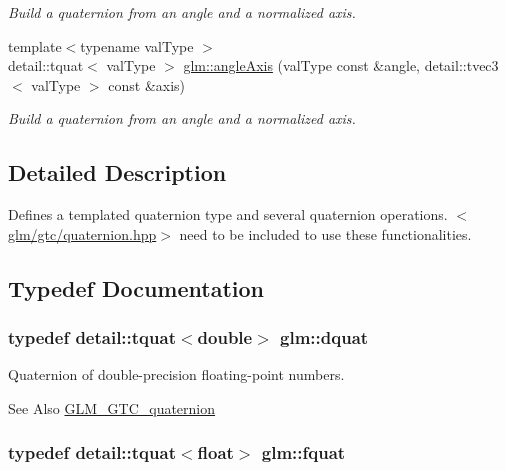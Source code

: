\begin{DoxyCompactItemize}
\begin{DoxyCompactList}\small\item\em Build a quaternion from an angle and a normalized axis. \end{DoxyCompactList}\item 
{\footnotesize template$<$typename val\-Type $>$ }\\detail\-::tquat$<$ val\-Type $>$ \hyperlink{group__gtc__quaternion_ga30071b5b9773087b7212a5ce67d0d90a}{glm\-::angle\-Axis} (val\-Type const \&angle, detail\-::tvec3$<$ val\-Type $>$ const \&axis)
\begin{DoxyCompactList}\small\item\em Build a quaternion from an angle and a normalized axis. \end{DoxyCompactList}\end{DoxyCompactItemize}


\subsection{Detailed Description}
Defines a templated quaternion type and several quaternion operations. $<$\hyperlink{quaternion_8hpp}{glm/gtc/quaternion.\-hpp}$>$ need to be included to use these functionalities. 

\subsection{Typedef Documentation}
\hypertarget{group__gtc__quaternion_ga80d5f590dba4e894218e1263233b02bb}{
\subsubsection[{dquat}]{\setlength{\rightskip}{0pt plus 5cm}typedef detail\-::tquat$<$double$>$ {\bf glm\-::dquat}}}\label{group__gtc__quaternion_ga80d5f590dba4e894218e1263233b02bb}


Quaternion of double-\/precision floating-\/point numbers. 

\begin{DoxySeeAlso}{See Also}
\hyperlink{group__gtc__quaternion}{G\-L\-M\-\_\-\-G\-T\-C\-\_\-quaternion} 
\end{DoxySeeAlso}
\hypertarget{group__gtc__quaternion_ga026fc67b7357f270b8226f9bcd1ac2c1}{
\subsubsection[{fquat}]{\setlength{\rightskip}{0pt plus 5cm}typedef detail\-::tquat$<$float$>$ {\bf glm\-::fquat}}}\label{group__gtc__quaternion_ga026fc67b7357f270b8226f9bcd1ac2c1}


